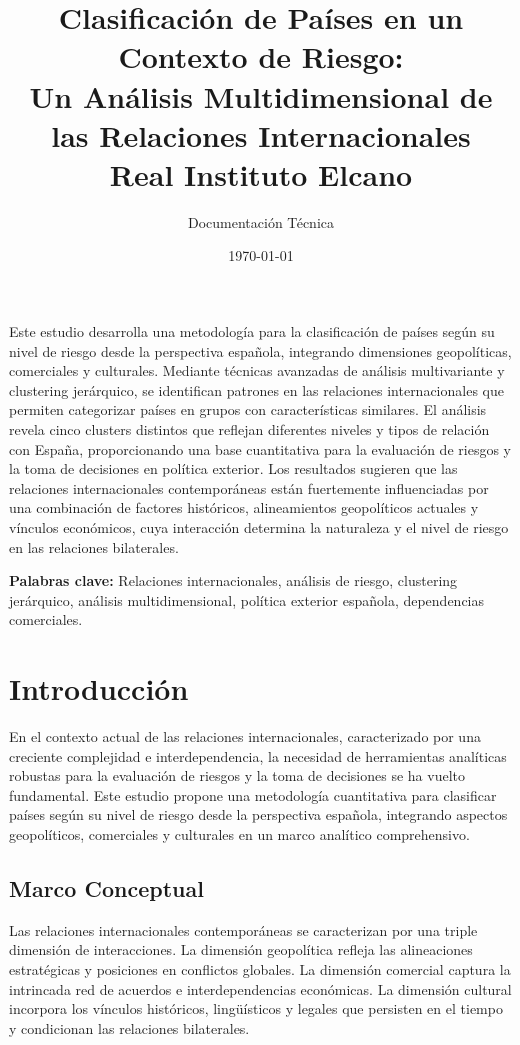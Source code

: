 \documentclass[11pt,a4paper]{article}
\title{\color{titlecolor}\Huge Clasificación de Países en un Contexto de Riesgo: \\
       Un Análisis Multidimensional de las Relaciones Internacionales\\[1cm]
       \large Real Instituto Elcano}
\author{\large Documentación Técnica}
\date{\today}
\begin{document}
\maketitle
\thispagestyle{empty}

\begin{tcolorbox}[colback=blue!5,colframe=blue!35,title=Resumen]
Este estudio desarrolla una metodología para la clasificación de países según su nivel de riesgo desde la perspectiva española, integrando dimensiones geopolíticas, comerciales y culturales. Mediante técnicas avanzadas de análisis multivariante y clustering jerárquico, se identifican patrones en las relaciones internacionales que permiten categorizar países en grupos con características similares. El análisis revela cinco clusters distintos que reflejan diferentes niveles y tipos de relación con España, proporcionando una base cuantitativa para la evaluación de riesgos y la toma de decisiones en política exterior. Los resultados sugieren que las relaciones internacionales contemporáneas están fuertemente influenciadas por una combinación de factores históricos, alineamientos geopolíticos actuales y vínculos económicos, cuya interacción determina la naturaleza y el nivel de riesgo en las relaciones bilaterales.
\end{tcolorbox}

\textbf{Palabras clave:} Relaciones internacionales, análisis de riesgo, clustering jerárquico, análisis multidimensional, política exterior española, dependencias comerciales.

\section{Introducción}

En el contexto actual de las relaciones internacionales, caracterizado por una creciente complejidad e interdependencia, la necesidad de herramientas analíticas robustas para la evaluación de riesgos y la toma de decisiones se ha vuelto fundamental. Este estudio propone una metodología cuantitativa para clasificar países según su nivel de riesgo desde la perspectiva española, integrando aspectos geopolíticos, comerciales y culturales en un marco analítico comprehensivo.

\subsection{Marco Conceptual}

Las relaciones internacionales contemporáneas se caracterizan por una triple dimensión de interacciones. La dimensión geopolítica refleja las alineaciones estratégicas y posiciones en conflictos globales. La dimensión comercial captura la intrincada red de acuerdos e interdependencias económicas. La dimensión cultural incorpora los vínculos históricos, lingüísticos y legales que persisten en el tiempo y condicionan las relaciones bilaterales.
\end{document}
